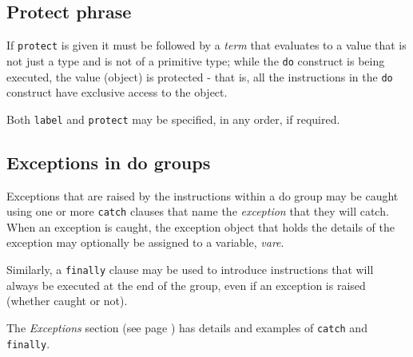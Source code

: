 \subsection{Protect phrase}
 
If \texttt{protect} is given it must be followed by a \emph{term}
that evaluates to a value that is not just a type and is not of a
primitive type; while the \texttt{do} construct is being executed, the
value (object) is protected - that is, all the instructions in the
\texttt{do} construct have exclusive access to the object.
 
Both \texttt{label} and \texttt{protect} may be specified, in any order,
if required.
\subsection{Exceptions in do groups}
 
Exceptions that are raised by the instructions within a do group may be
caught using one or more \texttt{catch} clauses that name the
\emph{exception} that they will catch.
When an exception is caught, the exception object that holds the details
of the exception may optionally be assigned to a variable,
\emph{vare}.
 
Similarly, a \texttt{finally} clause may be used to introduce
instructions that will always be executed at the end of the group, even
if an exception is raised (whether caught or not).
 
The  \emph{Exceptions} section (see page \pageref{refexcep})  has details and
examples of \texttt{catch} and \texttt{finally}.
\index{,}
